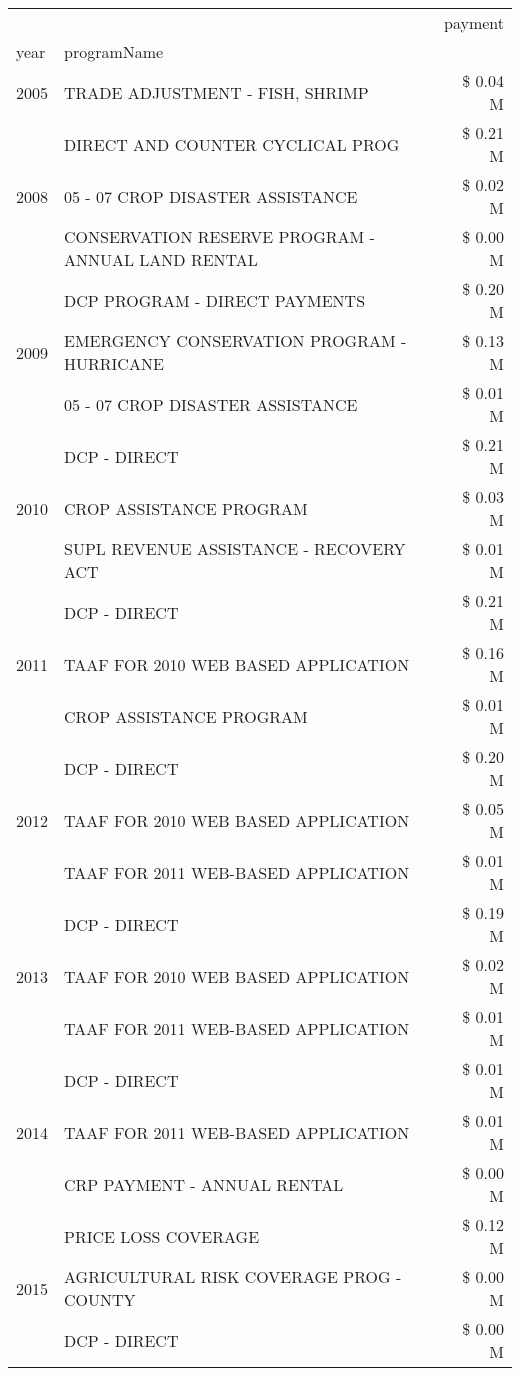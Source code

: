 \begin{tabular}{llr}
\toprule
 &  & payment \\
year & programName &  \\
\midrule
2005 & TRADE ADJUSTMENT - FISH, SHRIMP & \$ 0.04 M \\
\cline{1-3}
\multirow[t]{3}{*}{2008} & DIRECT AND COUNTER CYCLICAL PROG & \$ 0.21 M \\
 & 05 - 07 CROP DISASTER ASSISTANCE & \$ 0.02 M \\
 & CONSERVATION RESERVE PROGRAM - ANNUAL LAND RENTAL & \$ 0.00 M \\
\cline{1-3}
\multirow[t]{3}{*}{2009} & DCP PROGRAM - DIRECT PAYMENTS & \$ 0.20 M \\
 & EMERGENCY CONSERVATION PROGRAM - HURRICANE & \$ 0.13 M \\
 & 05 - 07 CROP DISASTER ASSISTANCE & \$ 0.01 M \\
\cline{1-3}
\multirow[t]{3}{*}{2010} & DCP - DIRECT & \$ 0.21 M \\
 & CROP ASSISTANCE PROGRAM & \$ 0.03 M \\
 & SUPL REVENUE ASSISTANCE - RECOVERY ACT & \$ 0.01 M \\
\cline{1-3}
\multirow[t]{3}{*}{2011} & DCP - DIRECT & \$ 0.21 M \\
 & TAAF FOR 2010 WEB BASED APPLICATION & \$ 0.16 M \\
 & CROP ASSISTANCE PROGRAM & \$ 0.01 M \\
\cline{1-3}
\multirow[t]{3}{*}{2012} & DCP - DIRECT & \$ 0.20 M \\
 & TAAF FOR 2010 WEB BASED APPLICATION & \$ 0.05 M \\
 & TAAF FOR 2011 WEB-BASED APPLICATION & \$ 0.01 M \\
\cline{1-3}
\multirow[t]{3}{*}{2013} & DCP - DIRECT & \$ 0.19 M \\
 & TAAF FOR 2010 WEB BASED APPLICATION & \$ 0.02 M \\
 & TAAF FOR 2011 WEB-BASED APPLICATION & \$ 0.01 M \\
\cline{1-3}
\multirow[t]{3}{*}{2014} & DCP - DIRECT & \$ 0.01 M \\
 & TAAF FOR 2011 WEB-BASED APPLICATION & \$ 0.01 M \\
 & CRP PAYMENT - ANNUAL RENTAL & \$ 0.00 M \\
\cline{1-3}
\multirow[t]{3}{*}{2015} & PRICE LOSS COVERAGE & \$ 0.12 M \\
 & AGRICULTURAL RISK COVERAGE PROG - COUNTY & \$ 0.00 M \\
 & DCP - DIRECT & \$ 0.00 M \\

\end{tabular}
